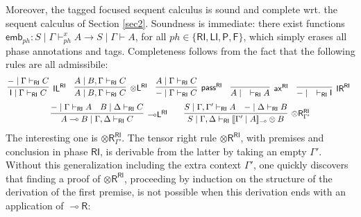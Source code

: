\documentclass[submission,copyright,creativecommons]{eptcs}
\newtheorem{lemma}[theorem]{Lemma}
\theoremstyle{definition}
\newcommand{\ldbc}{[\![}
\newcommand{\rdbc}{]\!]}
\newcommand{\tl}{\otimes \mathsf{L}}
\newcommand{\tr}{\otimes \mathsf{R}}
\newcommand{\lright}{{\multimap}\mathsf{R}}
\newcommand{\lleft}{{\multimap}\mathsf{L}}
\newcommand{\pass}{\mathsf{pass}}
\newcommand{\unitl}{\mathsf{IL}}
\newcommand{\unitr}{\mathsf{IR}}
\newcommand{\ax}{\mathsf{ax}}
\newcommand{\ot}{\otimes}
\newcommand{\lolli}{\multimap}
\newcommand{\I}{\mathsf{I}}
\newcommand{\RI}{\mathsf{RI}}
\newcommand{\LI}{\mathsf{LI}}
\newcommand{\Pass}{\mathsf{P}}
\newcommand{\F}{\mathsf{F}}
\newcommand{\NMILL}{\texttt{NMILL}}
\newcommand{\SkNMILL}{\NMILL\textsuperscript{\textit{s}}}
\begin{document}
 Moreover, the tagged focused sequent calculus is sound and complete wrt. the  sequent calculus of Section \ref{sec2}.
Soundness is immediate: there exist functions $\mathsf{emb}_{ph} : S \mid \Gamma \vdash^x_{ph} A \to S \mid \Gamma \vdash A$, for all $ph \in \{\RI,\LI,\Pass, \F \}$, which simply erases all phase annotations and tags. Completeness follows from the fact that the following rules are all admissibile: %
\begin{equation}\label{eq:admis}
  \begin{array}{c}
    \hspace{-3.9pt}
    \infer[\unitl^{\RI}]{\I \mid \Gamma \vdash_{\RI} C}{- \mid \Gamma \vdash_{\RI} C}
    \quad
    \infer[\tl^{\RI}]{A \mid B, \Gamma \vdash_{\RI} C}{A \mid B, \Gamma \vdash_{\RI} C}
    \quad
    \infer[\pass^{\RI}]{- \mid \Gamma \vdash_{\RI} C}{A \mid \Gamma \vdash_{\RI} C}
    \quad
    \infer[\ax^{\RI}]{A \mid \quad \vdash_{\RI} A}{}
    \quad
    \infer[\unitr^{\RI}]{- \mid \quad \vdash_{\RI} \I}{}
\\[6pt]
    \infer[\lleft^{\RI}]{A \lolli B \mid \Gamma , \Delta \vdash_{\RI} C}{
    - \mid \Gamma \vdash_{\RI} A
    &
    B \mid \Delta \vdash_{\RI} C
    }
    \qquad
    \infer[\tr_{\Gamma'}^{\RI}]{S \mid \Gamma , \Delta \vdash_{\RI} \ldbc \Gamma' \mid A \rdbc_{\lolli} \ot B}{
      S \mid \Gamma , \Gamma' \vdash_{\RI} A
      &
      - \mid \Delta \vdash_{\RI} B
    }
  \end{array}
\end{equation}
The interesting one is $\tr_{\Gamma'}^{\RI}$. The tensor right rule $\tr^\RI$, with premises and conclusion in phase $\RI$, is derivable from the latter by taking an empty $\Gamma'$. 
Without this generalization including the extra context $\Gamma'$, one quickly discovers that finding a proof of $\tr^\RI$, proceeding by induction on the structure of the derivation of the first premise, is not possible when this derivation ends with an application of $\lright$:
\end{document}

